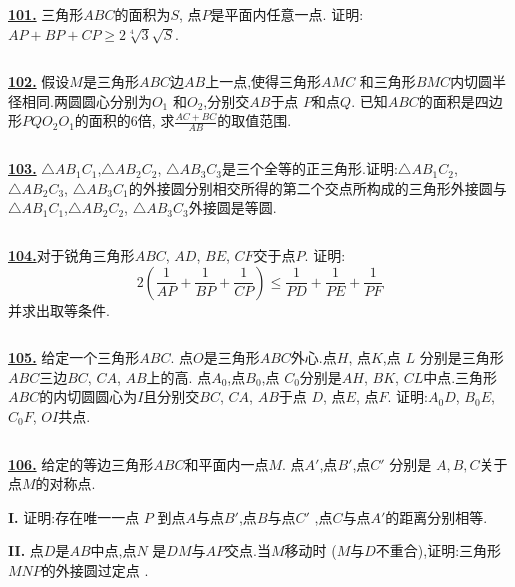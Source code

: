 \documentclass{article}
\begin{document}
$$ $$

\href{http://www.artofproblemsolving.com/Forum/viewtopic.php?p=230527#p230527
 }{\bf 101.} 三角形$ABC$的面积为$S$, 点$P$是平面内任意一点. 证明: $AP+BP+CP\geq 2\sqrt[4]{3}\sqrt{S}$.


$$ $$

\href{http://www.artofproblemsolving.com/Forum/viewtopic.php?p=124968#p124968
 }{\bf 102.} 假设$M$是三角形$ABC$边$AB$上一点,使得三角形$AMC$ 和三角形$BMC$内切圆半径相同.两圆圆心分别为$O_1$ 和$O_2$,分别交$AB$于点 $P$和点$Q$. 已知$ABC$的面积是四边形$PQO_2O_1$的面积的6倍, 求$\displaystyle \frac{AC+BC}{AB}$的取值范围.


$$ $$

\href{ http://www.artofproblemsolving.com/Forum/viewtopic.php?p=146876#p146876
}{\bf 103.} $\triangle AB_{1}C_{1}$,$\triangle AB_{2}C_{2}$, $\triangle AB_{3}C_{3}$是三个全等的正三角形.证明:$\triangle AB_{1}C_{2}$, $\triangle AB_{2}C_{3}$, $\triangle AB_{3}C_{1}$的外接圆分别相交所得的第二个交点所构成的三角形外接圆与$\triangle AB_{1}C_{1}$,$\triangle AB_{2}C_{2}$, $\triangle AB_{3}C_{3}$外接圆是等圆.


$$ $$

\href{ http://www.artofproblemsolving.com/Forum/viewtopic.php?p=201120#p201120
}{\bf 104.}对于锐角三角形$ABC$, $AD$, $BE$, $CF$交于点$P$.
证明:\\
$$\displaystyle 2\left(\frac{1}{AP}+\frac{1}{BP}+\frac{1}{CP}\right)\leq \frac{1}{PD}+\frac{1}{PE}+\frac{1}{PF}$$
并求出取等条件.


$$ $$


\href{http://www.artofproblemsolving.com/Forum/viewtopic.php?p=268390#p268390
 }{\bf 105.} 给定一个三角形$ABC$. 点$O$是三角形$ABC$外心.点$H$, 点$K$,点 $L$ 分别是三角形$ABC$三边$BC$, $CA$, $AB$上的高. 点$A_{0}$,点$B_{0}$,点 $C_{0}$分别是$AH$, $BK$, $CL$中点.三角形$ABC$的内切圆圆心为$I$且分别交$BC$, $CA$, $AB$于点 $D$, 点$E$, 点$F$. 证明:$A_{0}D$, $B_{0}E$, $C_{0}F$, $OI$共点.


$$ $$


\href{http://www.artofproblemsolving.com/Forum/viewtopic.php?p=268044#p268044
 }{\bf 106.} 给定的等边三角形$ABC$和平面内一点$M$. 点$A'$,点$B'$,点$C'$ 分别是 $A, B, C$关于点$M$的对称点.

{\bf I.} 证明:存在唯一一点 $P$ 到点$A$与点$B'$,点$B$与点$C'$ ,点$C$与点$A'$的距离分别相等.

{\bf II.}  点$D$是$AB$中点,点$N$ 是$DM$与$AP$交点.当$M$移动时 ($M$与$D$不重合),证明:三角形$MNP$的外接圆过定点 .


$$ $$
\end{document}
